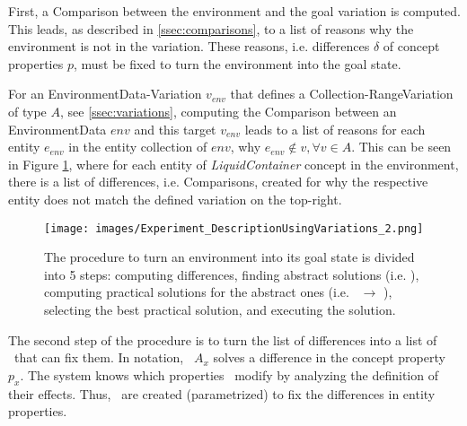 First, a Comparison between the environment and the goal variation is computed. This leads, as described in \ref{ssec:comparisons}, to a list of reasons why the environment is not in the variation. These reasons, i.e. differences $\delta$ of concept properties $p$, must be fixed to turn the environment into the goal state.

For an EnvironmentData-Variation $v_{env}$ that defines a Collection-RangeVariation of type $A$, see \ref{ssec:variations}, computing the Comparison between an EnvironmentData $env$ and this target $v_{env}$ leads to a list of reasons for each entity $e_{env}$ in the entity collection of $env$, why $e_{env} \not\in v, \forall v \in A$. This can be seen in Figure \ref{fig:experiment_description}, where for each entity of \textit{LiquidContainer} concept in the environment, there is a list of differences, i.e. Comparisons, created for why the respective entity does not match the defined variation on the top-right.

\begin{figure}[t!]
    \centering
    \texttt{[image: images/Experiment\_DescriptionUsingVariations\_2.png]}
    \caption{The procedure to turn an environment into its goal state is divided into 5 steps: computing differences, finding abstract solutions (i.e. \actions), computing practical solutions for the abstract ones (i.e. \actions\ $\rightarrow$ \skills), selecting the best practical solution, and executing the solution.} \label{fig:experiment_description}
\end{figure}
The second step of the procedure is to turn the list of differences into a list of \actions\ that can fix them. In notation, \action\ $A_x$ solves a difference in the concept property $p_x$. The system knows which properties \actions\ modify by analyzing the definition of their effects. Thus, \actions\ are created (parametrized) to fix the differences in entity properties.


